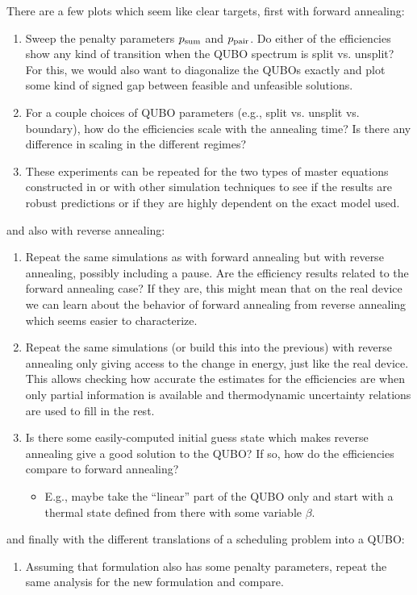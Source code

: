 \documentclass[aps,pra,amsmath,amssymb,amsfonts,lengthcheck,twocolumn,superscriptaddress]{revtex4-1}
\begin{document}
There are a few plots which seem like clear targets, first with forward annealing:
\begin{enumerate}
    \item Sweep the penalty parameters $p_{\rm sum}$ and $p_{\rm pair}$. Do either of the efficiencies show any kind of transition when the QUBO spectrum is split vs. unsplit? For this, we would also want to diagonalize the QUBOs exactly and plot some kind of signed gap between feasible and unfeasible solutions.
    \item For a couple choices of QUBO parameters (e.g., split vs. unsplit vs. boundary), how do the efficiencies scale with the annealing time? Is there any difference in scaling in the different regimes?
    \item These experiments can be repeated for the two types of master equations constructed in \cite{Albash2012} or with other simulation techniques to see if the results are robust predictions or if they are highly dependent on the exact model used. 
\end{enumerate}
and also with reverse annealing:
\begin{enumerate}
    \item Repeat the same simulations as with forward annealing but with reverse annealing, possibly including a pause. Are the efficiency results related to the forward annealing case? If they are, this might mean that on the real device we can learn about the behavior of forward annealing from reverse annealing which seems easier to characterize.
    \item Repeat the same simulations (or build this into the previous) with reverse annealing only giving access to the change in energy, just like the real device. This allows checking how accurate the estimates for the efficiencies are when only partial information is available and thermodynamic uncertainty relations are used to fill in the rest. 
    \item Is there some easily-computed initial guess state which makes reverse annealing give a good solution to the QUBO? If so, how do the efficiencies compare to forward annealing?
    \begin{itemize}
        \item[-] E.g., maybe take the ``linear'' part of the QUBO only and start with a thermal state defined from there with some variable $\beta$.
    \end{itemize}
\end{enumerate}
and finally with the different translations of a scheduling problem into a QUBO:
\begin{enumerate}
    \item Assuming that formulation also has some penalty parameters, repeat the same analysis for the new formulation and compare. 
\end{enumerate}
\end{document}
